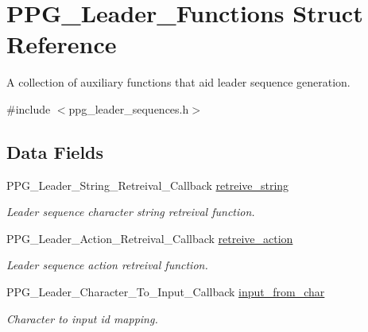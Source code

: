 \hypertarget{structPPG__Leader__Functions}{\section{P\-P\-G\-\_\-\-Leader\-\_\-\-Functions Struct Reference}
\label{structPPG__Leader__Functions}
}


A collection of auxiliary functions that aid leader sequence generation.  




{\ttfamily \#include $<$ppg\-\_\-leader\-\_\-sequences.\-h$>$}

\subsection*{Data Fields}
\begin{DoxyCompactItemize}
\item 
\hypertarget{structPPG__Leader__Functions_a1f8e19e26fa5859cec98d5d37e53d1d5}{P\-P\-G\-\_\-\-Leader\-\_\-\-String\-\_\-\-Retreival\-\_\-\-Callback \hyperlink{structPPG__Leader__Functions_a1f8e19e26fa5859cec98d5d37e53d1d5}{retreive\-\_\-string}}\label{structPPG__Leader__Functions_a1f8e19e26fa5859cec98d5d37e53d1d5}

\begin{DoxyCompactList}\small\item\em Leader sequence character string retreival function. \end{DoxyCompactList}\item 
\hypertarget{structPPG__Leader__Functions_a009239b6b5322a4fc31b5f36627f4876}{P\-P\-G\-\_\-\-Leader\-\_\-\-Action\-\_\-\-Retreival\-\_\-\-Callback \hyperlink{structPPG__Leader__Functions_a009239b6b5322a4fc31b5f36627f4876}{retreive\-\_\-action}}\label{structPPG__Leader__Functions_a009239b6b5322a4fc31b5f36627f4876}

\begin{DoxyCompactList}\small\item\em Leader sequence action retreival function. \end{DoxyCompactList}\item 
\hypertarget{structPPG__Leader__Functions_a16d2ccde07b906ea8770ac0c3f39835e}{P\-P\-G\-\_\-\-Leader\-\_\-\-Character\-\_\-\-To\-\_\-\-Input\-\_\-\-Callback \hyperlink{structPPG__Leader__Functions_a16d2ccde07b906ea8770ac0c3f39835e}{input\-\_\-from\-\_\-char}}\label{structPPG__Leader__Functions_a16d2ccde07b906ea8770ac0c3f39835e}

\begin{DoxyCompactList}\small\item\em Character to input id mapping. \end{DoxyCompactList}\end{DoxyCompactItemize}


